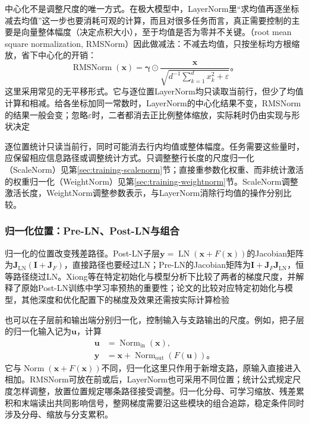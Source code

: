 中心化不是调整尺度的唯一方式。在极大模型中，LayerNorm里“求均值再逐坐标减去均值”这一步也要消耗可观的计算，而且对很多任务而言，真正需要控制的主要是向量整体幅度（决定点积大小），至于均值是否为零并不关键。（root mean square normalization, RMSNorm）因此做减法：不减去均值，只按坐标均方根缩放，省下中心化的开销：
\begin{equation}
  \operatorname{RMSNorm}(\bm x)
    =\bm\gamma\odot\frac{\bm x}
       {\sqrt{d^{-1}\sum_{k=1}^d x_k^2+\varepsilon}}\text{。}
  \label{eq:transformer-rmsnorm}
\end{equation}
这里采用常见的无平移形式。它与逐位置LayerNorm均只读取当前行，但少了均值计算和相减。给各坐标加同一常数时，LayerNorm的中心化结果不变，RMSNorm的结果一般会变；忽略$\varepsilon$时，二者都消去正比例整体缩放，实际耗时仍由实现与形状决定

逐位置统计只读当前行，同时可能消去行内均值或整体幅度。任务需要这些量时，应保留相应信息路径或调整统计方式。只调整整行长度的尺度归一化（ScaleNorm）见第\ref{sec:training-scalenorm}节；直接重参数化权重、而非统计激活的权重归一化（WeightNorm）见第\ref{sec:training-weightnorm}节。ScaleNorm调整激活长度，WeightNorm调整参数表示，与LayerNorm消除行均值的操作分别比较。

\subsubsection{归一化位置：Pre-LN、Post-LN与组合}

归一化的位置改变残差路径。Post-LN子层$\bm y=\operatorname{LN}(\bm x+F(\bm x))$的Jacobian矩阵为$\bm J_{\mathrm{LN}}(\bm I+\bm J_F)$，直接路径也要经过LN；Pre-LN的Jacobian矩阵为$\bm I+\bm J_F\bm J_{\mathrm{LN}}$，恒等路径绕过LN。Xiong等在特定初始化与模型分析下比较了两者的梯度尺度，并解释了原始Post-LN训练中学习率预热的重要性；论文的比较对应特定初始化与模型，其他深度和优化配置下的梯度及效果还需按实际计算检验

也可以在子层前和输出端分别归一化，控制输入与支路输出的尺度。例如，把子层的归一化输入记为$\bm u$，计算
\begin{equation}
  \begin{aligned}
    \bm u&=\operatorname{Norm}_{\mathrm{in}}(\bm x),\\
    \bm y&=\bm x+\operatorname{Norm}_{\mathrm{out}}(F(\bm u))\text{。}
  \end{aligned}
  \label{eq:transformer-combined-normalization}
\end{equation}
它与$\operatorname{Norm}(\bm x+F(\bm x))$不同，归一化这里只作用于新增支路，原输入直接进入相加。RMSNorm可放在前或后，LayerNorm也可采用不同位置；统计公式规定尺度怎样调整，放置位置规定哪条路径接受调整。归一化分母、可学习缩放、残差累积和末端读出共同影响信号，整网梯度需要沿这些模块的组合追踪，稳定条件同时涉及分母、缩放与分支累积。

